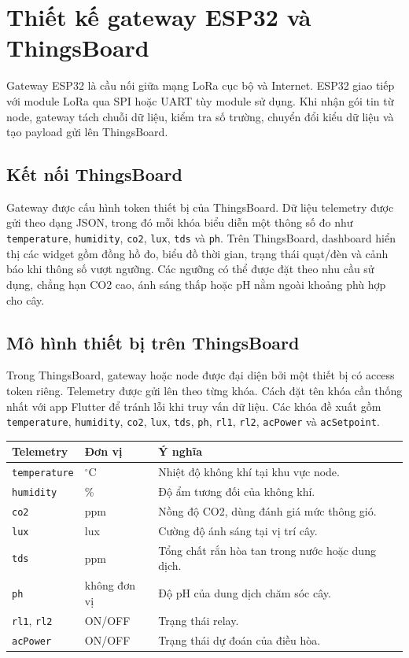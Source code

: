 \section{Thiết kế gateway ESP32 và ThingsBoard}
Gateway ESP32 là cầu nối giữa mạng LoRa cục bộ và Internet. ESP32 giao tiếp với module LoRa qua SPI hoặc UART tùy module sử dụng. Khi nhận gói tin từ node, gateway tách chuỗi dữ liệu, kiểm tra số trường, chuyển đổi kiểu dữ liệu và tạo payload gửi lên ThingsBoard.

\subsection{Kết nối ThingsBoard}
Gateway được cấu hình token thiết bị của ThingsBoard. Dữ liệu telemetry được gửi theo dạng JSON, trong đó mỗi khóa biểu diễn một thông số đo như \texttt{temperature}, \texttt{humidity}, \texttt{co2}, \texttt{lux}, \texttt{tds} và \texttt{ph}.
Trên ThingsBoard, dashboard hiển thị các widget gồm đồng hồ đo, biểu đồ thời gian, trạng thái quạt/đèn và cảnh báo khi thông số vượt ngưỡng. Các ngưỡng có thể được đặt theo nhu cầu sử dụng, chẳng hạn CO2 cao, ánh sáng thấp hoặc pH nằm ngoài khoảng phù hợp cho cây.

\subsection{Mô hình thiết bị trên ThingsBoard}
Trong ThingsBoard, gateway hoặc node được đại diện bởi một thiết bị có access token riêng. Telemetry được gửi lên theo từng khóa. Cách đặt tên khóa cần thống nhất với app Flutter để tránh lỗi khi truy vấn dữ liệu. Các khóa đề xuất gồm \texttt{temperature}, \texttt{humidity}, \texttt{co2}, \texttt{lux}, \texttt{tds}, \texttt{ph}, \texttt{rl1}, \texttt{rl2}, \texttt{acPower} và \texttt{acSetpoint}.

\begin{longtable}{|p{3.5cm}|p{3cm}|p{6cm}|}
\hline
\textbf{Telemetry} & \textbf{Đơn vị} & \textbf{Ý nghĩa} \\
\hline
\texttt{temperature} & $^\circ$C & Nhiệt độ không khí tại khu vực node. \\
\hline
\texttt{humidity} & \% & Độ ẩm tương đối của không khí. \\
\hline
\texttt{co2} & ppm & Nồng độ CO2, dùng đánh giá mức thông gió. \\
\hline
\texttt{lux} & lux & Cường độ ánh sáng tại vị trí cây. \\
\hline
\texttt{tds} & ppm & Tổng chất rắn hòa tan trong nước hoặc dung dịch. \\
\hline
\texttt{ph} & không đơn vị & Độ pH của dung dịch chăm sóc cây. \\
\hline
\texttt{rl1}, \texttt{rl2} & ON/OFF & Trạng thái relay. \\
\hline
\texttt{acPower} & ON/OFF & Trạng thái dự đoán của điều hòa. \\
\hline
\end{longtable}

